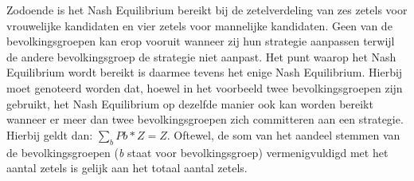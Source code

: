 Zodoende is het Nash Equilibrium bereikt bij de zetelverdeling van zes zetels voor vrouwelijke kandidaten en vier zetels voor mannelijke kandidaten. Geen van de bevolkingsgroepen kan erop vooruit wanneer zij hun strategie aanpassen terwijl de andere bevolkingsgroep de strategie niet aanpast. Het punt waarop het Nash Equilibrium wordt bereikt is daarmee tevens het enige Nash Equilibrium. Hierbij moet genoteerd worden dat, hoewel in het voorbeeld twee bevolkingsgroepen zijn gebruikt, het Nash Equilibrium op dezelfde manier ook kan worden bereikt wanneer er meer dan twee bevolkingsgroepen zich committeren aan een strategie. Hierbij geldt dan: $\sum_{b} P{b} * Z = Z$. Oftewel, de som van het aandeel stemmen van de bevolkingsgroepen (\textit{b} staat voor bevolkingsgroep) vermenigvuldigd met het aantal zetels is gelijk aan het totaal aantal zetels.




 
